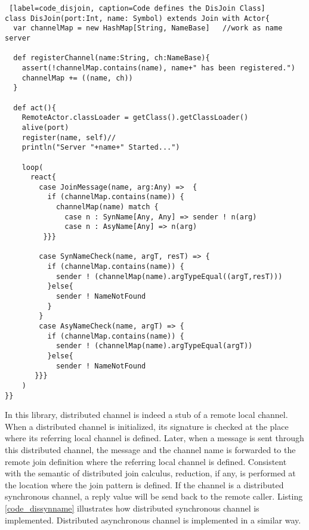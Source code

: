 \begin{lstlisting} [label=code_disjoin, caption=Code defines the DisJoin Class]
class DisJoin(port:Int, name: Symbol) extends Join with Actor{
  var channelMap = new HashMap[String, NameBase]   //work as name server
  
  def registerChannel(name:String, ch:NameBase){
    assert(!channelMap.contains(name), name+" has been registered.")
    channelMap += ((name, ch))
  }  
  
  def act(){
    RemoteActor.classLoader = getClass().getClassLoader()
    alive(port)
    register(name, self)//
    println("Server "+name+" Started...")
    
    loop(
      react{
        case JoinMessage(name, arg:Any) =>  {
          if (channelMap.contains(name)) {
            channelMap(name) match {
              case n : SynName[Any, Any] => sender ! n(arg)
              case n : AsyName[Any] => n(arg)
         }}}

        case SynNameCheck(name, argT, resT) => {
          if (channelMap.contains(name)) {
            sender ! (channelMap(name).argTypeEqual((argT,resT)))
          }else{
            sender ! NameNotFound
          }
        }
        case AsyNameCheck(name, argT) => {
          if (channelMap.contains(name)) {
            sender ! (channelMap(name).argTypeEqual(argT))
          }else{
            sender ! NameNotFound
       }}}
    )
}}
\end{lstlisting}

In this library, distributed channel is indeed a stub of a remote local channel.  When a distributed channel is initialized, its signature is checked at the place where its referring local channel is defined.  Later, when a message is sent through this distributed channel, the message and the channel name is forwarded to the remote join definition where the  referring local channel is defined.  Consistent with the semantic of distributed join calculus, reduction, if any, is performed at the location where the join pattern is defined.  If the channel is a distributed synchronous channel, a reply value will be send back to the remote caller.  Listing \ref{code_dissynname} illustrates how distributed synchronous channel is implemented.  Distributed asynchronous channel is implemented in a similar way.  


